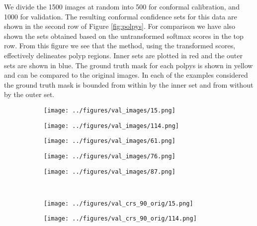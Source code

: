 We divide the 1500 images at random into 500 for conformal calibration, and 1000 for validation. The resulting conformal confidence sets for this data are shown in the second row of Figure \ref{fig:polpys}. For comparison we have also shown the sets obtained based on the untransformed softmax scores in the top row. From this figure we see that the method, using the transformed scores, effectively delineates polyp regions. Inner sets are plotted in red and the outer sets are shown in blue. The ground truth mask for each polpys is shown in yellow and can be compared to the original images. In each of the examples considered the ground truth mask is bounded from within by the inner set and from without by the outer set. 

\begin{figure}
	\begin{subfigure}{0.19\textwidth}
		\centering
		\texttt{[image: ../figures/val\_images/15.png]}
		\label{fig:1}
	\end{subfigure}
	\begin{subfigure}{0.19\textwidth}
		\centering
		\texttt{[image: ../figures/val\_images/114.png]}
		\label{fig:1}
	\end{subfigure}
	\begin{subfigure}{0.19\textwidth}
		\centering
		\texttt{[image: ../figures/val\_images/61.png]}
		\label{fig:1}
	\end{subfigure}
	\begin{subfigure}{0.19\textwidth}
		\centering
		\texttt{[image: ../figures/val\_images/76.png]}
		\label{fig:1}
	\end{subfigure}
	\begin{subfigure}{0.19\textwidth}
		\centering
		\texttt{[image: ../figures/val\_images/87.png]}
		\label{fig:1}
	\end{subfigure}
		\vspace{-0.4cm}
	\\
		\begin{subfigure}{0.19\textwidth}
		\centering
		\texttt{[image: ../figures/val\_crs\_90\_orig/15.png]}
		\label{fig:1}
	\end{subfigure}
	\begin{subfigure}{0.19\textwidth}
		\centering
		\texttt{[image: ../figures/val\_crs\_90\_orig/114.png]}
		\label{fig:1}
	\end{subfigure}
	\begin{subfigure}{0.19\textwidth}

\end{subfigure}
\end{figure}
